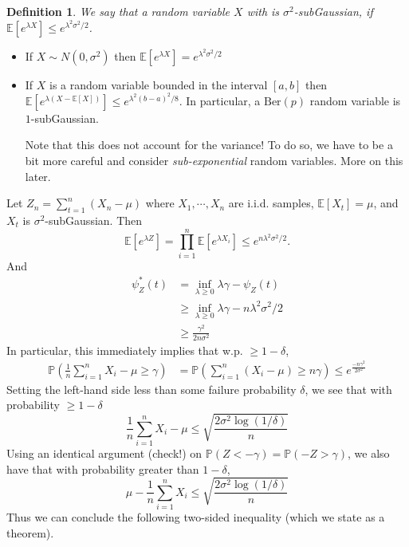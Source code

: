 \documentclass[11pt]{article}
\newtheorem{definition}{Definition}
\renewcommand{\P}{\mathbb{P}}
\newcommand{\E}{\mathbb{E}}
\newcommand{\1}[1]{\mathbf{1}\left\{#1\right\}}
\begin{document}
\begin{definition}
    We say that a random variable $X$ with is $\sigma^2$-subGaussian, if $\E[e^{\lambda X}] \leq e^{\lambda^2\sigma^2/2}$.
\end{definition} 
\begin{itemize}
    \item If $X\sim N(0,\sigma^2)$ then $\E[e^{\lambda X}] = e^{\lambda^2\sigma^2/2}$
    \item If $X$ is a random variable bounded in the interval $[a,b]$ then $\E[e^{\lambda (X-\E[X])}] \leq  e^{\lambda^2(b-a)^2/8}$. In particular, a $\text{Ber}(p)$ random variable is $1$-subGaussian.
    
    Note that this does not account for the variance! To do so, we have to be a bit more careful and consider \textit{sub-exponential} random variables. More on this later.
\end{itemize}


Let $Z_n = \sum_{t=1}^{n} (X_n - \mu)$ where $X_1,\cdots, X_n$ are i.i.d. samples, $\E[X_t] = \mu$, and $X_t$ is $\sigma^{2}$-subGaussian. Then 
\[\E[e^{\lambda Z}] = \prod_{i=1}^n \E[e^{\lambda X_i}] \leq e^{n\lambda^2\sigma^2/2}.\]
And 
\begin{align*}
    \psi_Z^{\ast}(t) 
    &= \inf_{\lambda \geq 0} \lambda \gamma - \psi_Z(t)\\
    &\geq  \inf_{\lambda \geq 0} \lambda \gamma - n\lambda^2\sigma^2/2\tag{Set $\lambda= \gamma/n\sigma^2$}\\
    &\geq \frac{\gamma^2}{2n\sigma^2}
\end{align*}
In particular, this immediately implies that w.p. $\geq 1-\delta$, 
\begin{align*}
\P(\frac{1}{n}\sum_{i=1}^n X_i - \mu \geq \gamma)
&= \P(\sum_{i=1}^n (X_i - \mu) \geq n\gamma)
\leq e^{\frac{-n\gamma^2}{2\sigma^2}}
\end{align*}
Setting the left-hand side less than some failure probability $\delta$, we see that with probability $\geq 1-\delta$
\[\frac{1}{n}\sum_{i=1}^n X_i - \mu \leq \sqrt{\frac{2\sigma^2\log(1/\delta)}{n}}\]
Using an identical argument (check!) on $\P(Z < -\gamma) = \P(-Z > \gamma)$, we also have that with probability greater than $1-\delta$, 
\[\mu - \frac{1}{n}\sum_{i=1}^n X_i \leq \sqrt{\frac{2\sigma^2\log(1/\delta)}{n}}\]
Thus we can conclude the following two-sided inequality (which we state as a theorem).
\end{document}
